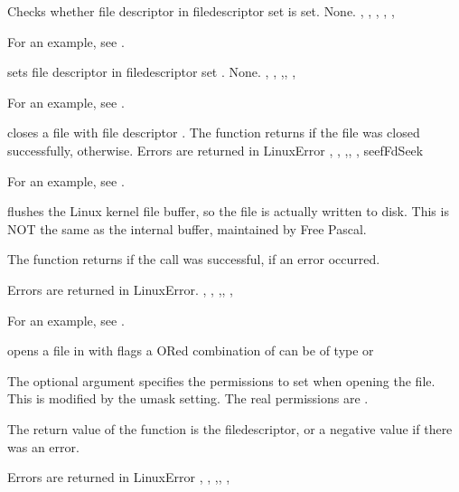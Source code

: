 { Checks whether file descriptor  in filedescriptor set 
is set.}
{None.}
{, , ,
, 
,
}

For an example, see .

{ sets file descriptor  in filedescriptor set .}
{None.}
{, , ,, 
, }

For an example, see .

{
 closes a file with file descriptor . The function
returns  if the file was closed successfully, 
otherwise. 
}
{Errors are returned in LinuxError}
{, , ,,
, seef{FdSeek}}

For an example, see .

{ flushes the Linux kernel file buffer, so the file is actually
written to disk. This is NOT the same as the internal buffer, maintained by
Free Pascal. 

The function returns  if the call was successful,  if
an error occurred.}
{Errors are returned in LinuxError.}
{, , ,,
, }

For an example, see .

{  opens a file in  with flags  a ORed combination of
    can be of type  or

  The optional  argument specifies the permissions to set when opening
  the file. This is modified by the umask setting. The real permissions are
  .

  The return value of the function is the filedescriptor, or a negative 
  value if there was an error.
}
{Errors are returned in LinuxError}
{, , ,,
, }

